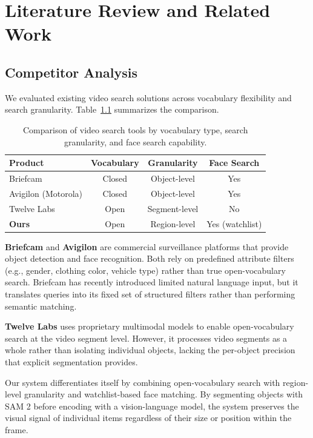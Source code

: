 \chapter{Literature Review and Related Work}
\label{chap:relatedworks}

\section{Competitor Analysis}
\label{section:competitor-analysis}

We evaluated existing video search solutions across vocabulary flexibility and search granularity. Table~\ref{tab:competitive-landscape} summarizes the comparison.

\begin{table}[h]
    \centering
    \begin{tabular}{lccc}
        \toprule
        \textbf{Product} & \textbf{Vocabulary} & \textbf{Granularity} & \textbf{Face Search} \\
        \midrule
        Briefcam & Closed & Object-level & Yes \\
        Avigilon (Motorola) & Closed & Object-level & Yes \\
        Twelve Labs & Open & Segment-level & No \\
        \midrule
        \textbf{Ours} & Open & Region-level & Yes (watchlist) \\
        \bottomrule
    \end{tabular}
    \caption{Comparison of video search tools by vocabulary type, search granularity, and face search capability.}
    \label{tab:competitive-landscape}
\end{table}

\textbf{Briefcam} and \textbf{Avigilon} are commercial surveillance platforms that provide object detection and face recognition. Both rely on predefined attribute filters (e.g., gender, clothing color, vehicle type) rather than true open-vocabulary search. Briefcam has recently introduced limited natural language input, but it translates queries into its fixed set of structured filters rather than performing semantic matching.

\textbf{Twelve Labs} uses proprietary multimodal models to enable open-vocabulary search at the video segment level. However, it processes video segments as a whole rather than isolating individual objects, lacking the per-object precision that explicit segmentation provides.

Our system differentiates itself by combining open-vocabulary search with region-level granularity and watchlist-based face matching. By segmenting objects with SAM 2 before encoding with a vision-language model, the system preserves the visual signal of individual items regardless of their size or position within the frame.

